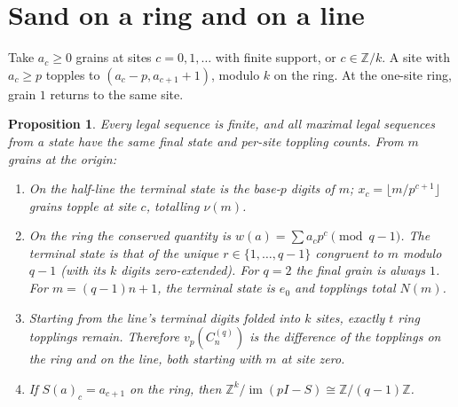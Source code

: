 \documentclass[10pt]{article}
\newtheorem{proposition}{Proposition}
\theoremstyle{definition}\newtheorem*{definition}{Definition}
\theoremstyle{remark}\newtheorem*{remark}{Remark}
\begin{document}
\section{Sand on a ring and on a line}
Take $a_c\ge0$ grains at sites $c=0,1,\ldots$ with finite support, or $c\in
\mathbb Z/k$. A site with $a_c\ge p$ topples to $(a_c-p,a_{c+1}+1)$, modulo $k$
on the ring. At the one-site ring, grain $1$ returns to the same site.
\begin{proposition}\label{sand} Every legal sequence is finite, and all maximal
legal sequences from a state have the same final state and per-site toppling
counts. From $m$ grains at the origin:
\begin{enumerate}
\item On the half-line the terminal state is the base-$p$ digits of $m$;
$x_c=\lfloor m/p^{c+1}\rfloor$ grains topple at site $c$, totalling $\nu(m)$.
\item On the ring the conserved quantity is $w(a)=\sum a_cp^c\pmod{q-1}$. The
terminal state is that of the unique $r\in\{1,\ldots,q-1\}$ congruent to $m$
modulo $q-1$ (with its $k$ digits zero-extended). For $q=2$ the final grain is
always $1$. For $m=(q-1)n+1$, the terminal state is $e_0$ and topplings total
$N(m)$.
\item Starting from the line's terminal digits folded into $k$ sites, exactly $t$
ring topplings remain. Therefore $v_p(C_n^{(q)})$ is the difference of the
topplings on the ring and on the line, both starting with $m$ at site zero.
\item If $S(a)_c=a_{c+1}$ on the ring, then $\mathbb Z^k/\operatorname{im}(pI-S)
\cong\mathbb Z/(q-1)\mathbb Z$.
\end{enumerate}\end{proposition}
\end{document}
